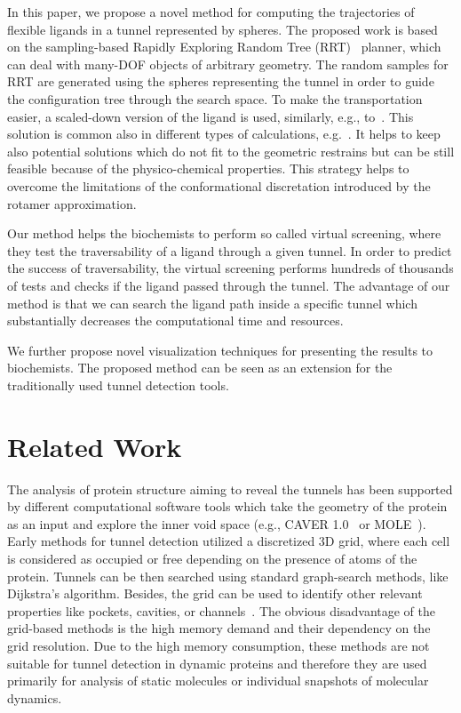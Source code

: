 \documentclass{svmult}
\newcommand{\red}[1]{\textcolor{red}{#1}}
\begin{document}
In this paper, we propose a novel method for computing the trajectories of flexible ligands in a tunnel represented by spheres.
The proposed work is based on the sampling-based Rapidly Exploring Random Tree (RRT)~\cite{lavalleRRT} planner, which
can deal with many-DOF objects of arbitrary geometry.
The random samples for RRT are generated using the spheres representing the tunnel in order to guide the configuration tree through the search space.
To make the transportation easier, a scaled-down version of the ligand is used, similarly, e.g., to~\cite{cortes2005path}.
This solution is common also in different types of calculations, e.g.~\cite{kellogg}. 
It helps to keep also potential solutions which do not fit to the geometric restrains but can be still feasible because of the physico-chemical properties.
This strategy helps to overcome the limitations of the conformational discretation introduced by the rotamer approximation.

Our method helps the biochemists to perform so called virtual screening, where they test the traversability of a ligand through a given tunnel.
In order to predict the success of traversability, the virtual screening performs hundreds of thousands of tests and checks if the ligand passed through the tunnel.
The advantage of our method is that we can search the ligand path inside a specific tunnel which substantially decreases the computational time and resources.

We further propose novel visualization techniques for presenting the results to biochemists.
The proposed method can be seen as an extension for the traditionally used tunnel detection tools.



\section{Related Work}


The analysis of protein structure aiming to reveal the tunnels has been supported by different computational software tools which take the geometry of the protein as an input and explore the inner void space (e.g., CAVER 1.0~\cite{petrek2006caver} or MOLE~\cite{Petrek20071357}). 
Early methods for tunnel detection utilized a discretized 3D grid, where each cell is considered as occupied or free depending
on the presence of atoms of the protein.
Tunnels can be then searched using standard graph-search methods, like Dijkstra's algorithm.
Besides, the grid can be used to identify other relevant properties like 
pockets, cavities, or channels~\cite{sehnal2013mole,petrek2006caver}.
The obvious disadvantage of the grid-based methods is the high memory demand and their dependency on the grid resolution.
Due to the high memory consumption, these methods are not suitable for tunnel detection in dynamic proteins and therefore they
are used primarily for analysis of static molecules or individual snapshots of molecular dynamics.
\end{document}
